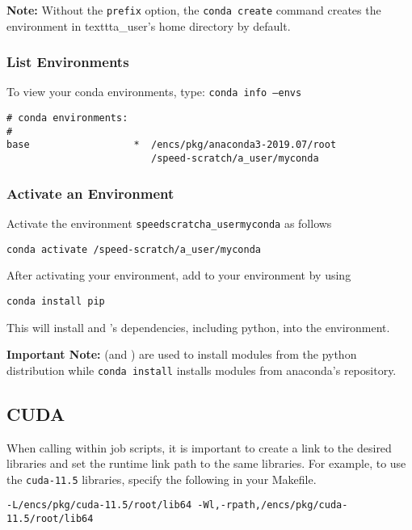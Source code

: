 \documentclass{easychair}
\begin{document}
\vspace{10pt}
\noindent
\textbf{Note:} Without the \texttt{\-\-prefix} option, the \texttt{conda create} command creates the 
environment in texttt{a\_user}'s home directory by default.
\vspace{10pt}

\subsubsection{List Environments}
To view your conda environments, type: \texttt{conda info --envs}

\begin{verbatim}
# conda environments:
#
base                  *  /encs/pkg/anaconda3-2019.07/root
                         /speed-scratch/a_user/myconda
\end{verbatim}      

\subsubsection{Activate an Environment}
Activate the environment \texttt{\/speed\-scratch\/a\_user\/myconda} as follows
\begin{verbatim}
conda activate /speed-scratch/a_user/myconda
\end{verbatim}
After activating your environment, add  to your environment by using 
\begin{verbatim}
conda install pip
\end{verbatim}
This will install  and 's dependencies, including python, 
into the environment.

\vspace{10pt}
\noindent
\textbf{Important Note:}  (and ) are used to install modules
 from the python distribution while \texttt{conda install} installs modules from 
 anaconda's repository.
\vspace{10pt}
\subsection{CUDA}

When calling  within job scripts, it is important to create a link to
 the desired  libraries and set the runtime link path to the same libraries. 
For example, to use the \texttt{cuda-11.5} libraries, specify the following in 
your Makefile.
\begin{verbatim}
-L/encs/pkg/cuda-11.5/root/lib64 -Wl,-rpath,/encs/pkg/cuda-11.5/root/lib64
\end{verbatim}
\end{document}
